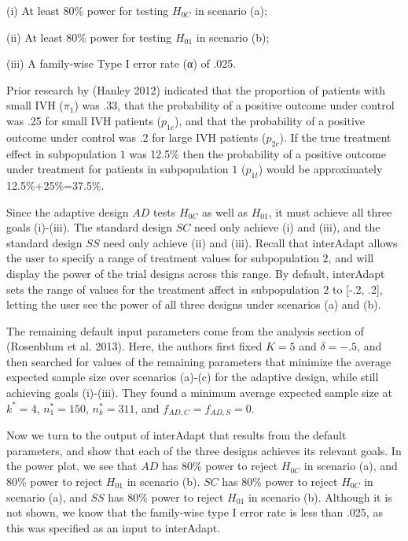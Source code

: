 \documentclass{article}
\newcommand{\interAdapt}{\textsf{interAdapt }}
\begin{document}
\begin{description}
\item  (i) At least 80\% power for testing $H_{0C}$ in scenario (a);
\item  (ii) At least 80\% power for testing $H_{01}$ in scenario (b);
\item  (iii) A family-wise Type I error rate (α) of .025.
\end{description}

Prior research by (Hanley 2012)\cite{Hanley2012} indicated that the proportion of patients with small IVH ($π_1$) was .33, that the probability of a positive outcome under control was .25 for small IVH patients ($p_{1c}$), and that the probability of a positive outcome under control was .2 for large IVH patients ($p_{2c}$).  If the true treatment effect in subpopulation $1$ was 12.5\% then the probability of a positive outcome under treatment for patients in subpopulation $1$ ($p_{1t}$) would be approximately 12.5\%+25\%=37.5\%.

Since the adaptive design $AD$ tests $H_{0C}$ as well as $H_{01}$, it must achieve all three goals (i)-(iii). The standard design $SC$ need only achieve (i) and (iii), and the standard design $SS$ need only achieve (ii) and (iii). Recall that \interAdapt allows the user to specify a range of treatment values for subpopulation $2$, and will display the power of the trial designs across this range. By default, \interAdapt sets the range of values for the treatment affect in subpopulation $2$ to [-.2, .2], letting the user see the power of all three designs under scenarios (a) and (b). %
 
The remaining default input parameters come from the analysis section of (Rosenblum et al. 2013)\cite{Rosenblum2013AdaptMISTIE}. Here, the authors first fixed $K=5$ and $δ=-.5$, and then searched for values of the remaining parameters that minimize the average expected sample size over scenarios (a)-(c) for the adaptive design, while still achieving goals (i)-(iii). They found a minimum average expected sample size at $k^*=4$, $n_1^*=150$, $n_k^*=311$, and $f_{AD,C}=f_{AD,S}=0$. %

Now we turn to the output of \interAdapt that results from the default parameters, and show that each of the three designs achieves its relevant goals. In the power plot, we see that $AD$ has 80\% power to reject $H_{0C}$ in scenario (a), and 80\% power to reject $H_{01}$ in scenario (b). $SC$ has 80\% power to reject $H_{0C}$ in scenario (a), and $SS$ has 80\% power to reject $H_{01}$ in scenario (b). Although it is not shown, we know that the family-wise type I error rate is less than .025, as this was specified as an input to \textsf{interAdapt}. %
\end{document}
